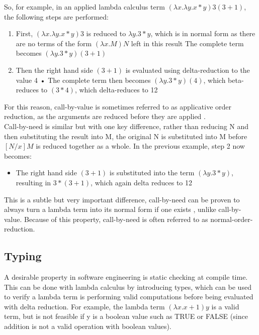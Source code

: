 \documentclass[a4paper,12pt]{report}
\begin{document}
So, for example, in an applied lambda calculus term $(\lambda x.\lambda y.x*y)3(3+1)$, the following steps are performed:

\begin{enumerate}
	\item First, $(\lambda x.\lambda y.x*y)3$ is reduced to $\lambda y.3*y$, which is in normal form as there are no terms of the form $(\lambda x.M)N$ left in this result
	\subitem The complete term becomes $(\lambda y.3*y)(3+1)$
	\item Then the right hand side $(3+1)$ is evaluated using delta-reduction to the value 4
	\subitem •	The complete term then becomes $(\lambda y.3*y)(4)$, which beta-reduces to $(3*4)$, which delta-reduces to 12
\end{enumerate}

For this reason, call-by-value is sometimes referred to as applicative order reduction, as the arguments are reduced before they are applied \cite{Sookocheff2018Evaluation}.\\

Call-by-need is similar but with one key difference, rather than reducing N and then substituting the result into M, the original N is substituted into M before $[N / x]M$ is reduced together as a whole. In the previous example, step 2 now becomes:

\begin{itemize}
	\item The right hand side $(3+1)$ is substituted into the term $(\lambda y.3*y)$, resulting in $3*(3+1)$, which again delta reduces to 12
\end{itemize}

This is a subtle but very important difference, call-by-need can be proven to always turn a lambda term into its normal form if one exists \cite{Horowitz2013}, unlike call-by-value. Because of this property, call-by-need is often referred to as normal-order-reduction.

\subsection{Typing}

A desirable property in software engineering is static checking at compile time. This can be done with lambda calculus by introducing types, which can be used to verify a lambda term is performing valid computations before being evaluated with delta reduction. For example, the lambda term $(\lambda x.x+1)y$ is a valid term, but is not feasible if y is a boolean value such as TRUE or FALSE (since addition is not a valid operation with boolean values).\\
\end{document}
